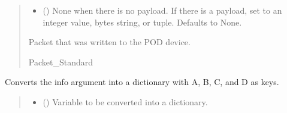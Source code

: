 \documentclass[letterpaper,10pt,english]{sphinxmanual}
\begin{document}
\begin{fulllineitems}
\begin{fulllineitems}
\begin{quote}
\begin{description}
\begin{itemize}
\item {} 
\sphinxAtStartPar
{} (\sphinxstyleliteralemphasis{\sphinxupquote{ | }}\sphinxstyleliteralemphasis{\sphinxupquote{ | }}\sphinxstyleliteralemphasis{\sphinxupquote{{[}}}\sphinxstyleliteralemphasis{\sphinxupquote{ | }}\sphinxstyleliteralemphasis{\sphinxupquote{{]}}}\sphinxstyleliteralemphasis{\sphinxupquote{, }}) \textendash{} None when there is no payload. If there                 is a payload, set to an integer value, bytes string, or tuple. Defaults to None.

\end{itemize}

\sphinxAtStartPar
Packet that was written to the POD device.

\sphinxAtStartPar
Packet\_Standard

\end{description}\end{quote}

\end{fulllineitems}


\begin{fulllineitems}
\label{\detokenize{Morelia.Devices:Morelia.Devices.PodDevice_8401HR.Pod8401HR._FixABCDtype}}
\pysigstartsignatures
{}
\pysigstopsignatures
\sphinxAtStartPar
Converts the info argument into a dictionary with A, B, C, and D as keys.
\begin{quote}\begin{description}
\begin{itemize}
\item {} 
\sphinxAtStartPar
{} (\sphinxstyleliteralemphasis{\sphinxupquote{ | }}\sphinxstyleliteralemphasis{\sphinxupquote{ | }}) \textendash{} Variable to be converted into a dictionary.


\end{itemize}
\end{description}
\end{quote}
\end{fulllineitems}
\end{fulllineitems}
\end{document}
